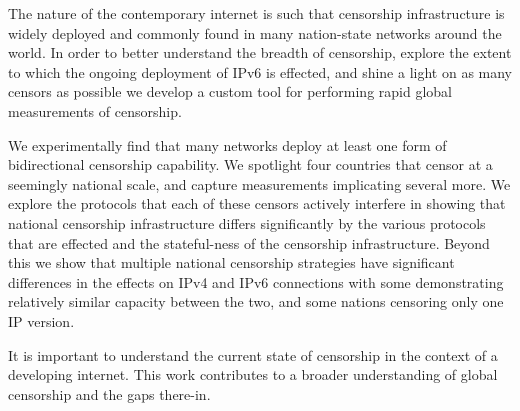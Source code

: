 The nature of the contemporary internet is such that censorship infrastructure
is widely deployed and commonly found in many nation-state networks around the
world. In order to better understand the breadth of censorship, explore the
extent to which the ongoing deployment of IPv6 is effected, and shine a light on
as many censors as possible we develop a custom tool for performing rapid global
measurements of censorship.

We experimentally find that many networks deploy at least one form of
bidirectional censorship capability. We spotlight four countries that censor at
a seemingly national scale, and capture measurements implicating several more.
We explore the protocols that each of these censors actively interfere in
showing that national censorship infrastructure differs significantly by the
various protocols that are effected and the stateful-ness of the censorship
infrastructure. Beyond this we show that multiple national censorship strategies
have significant differences in the effects on IPv4 and IPv6 connections with
some demonstrating relatively similar capacity between the two, and some nations
censoring only one IP version.

It is important to understand the current state of censorship in the context of
a developing internet. This work contributes to a broader understanding of
global censorship and the gaps there-in.
